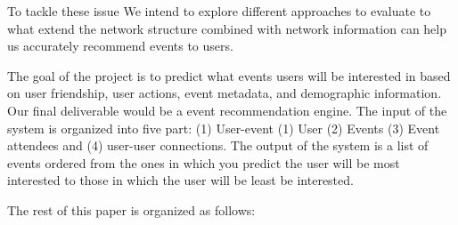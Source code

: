 \documentclass{article}
\begin{document}
To tackle these issue We intend to explore different approaches to evaluate to what extend the network structure combined with network information can help us accurately recommend events to users.

The goal of the project is to predict what events users will be interested in based on user friendship, user actions, event metadata, and demographic information. Our final deliverable would be a event recommendation engine. The input of the system is organized into five part: (1) User-event (1) User (2) Events (3) Event attendees and (4) user-user connections. The output of the system is a list of events ordered from the ones in which you predict the user will be most interested to those in which the user will be least be interested.

The rest of this paper is organized as follows:



\end{document}

